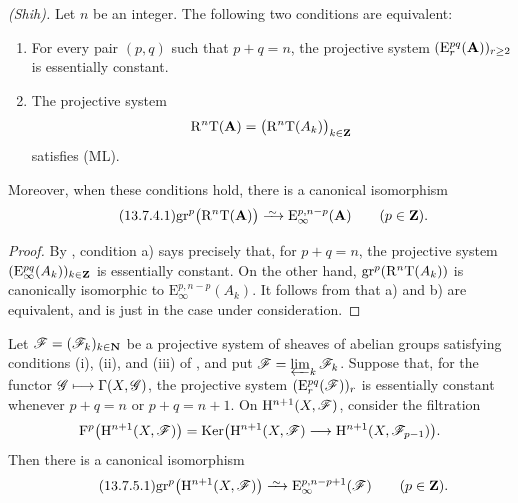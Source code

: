 \begin{proposition}[13.7.4]
\label{0.13.7.4}
\emph{(Shih).}
Let $n$ be an integer.
The following two conditions are equivalent:
\begin{enumerate}
  \item[{\rm a)}] For every pair $(p,q)$ such that $p+q=n$, the
  projective system
  $(\mathrm{E}_r^{pq}(\mathbf{A}))_{r\geq2}$ is essentially constant.
  \item[{\rm b)}] The projective system
  \[
    \mathrm{R}^n\mathrm{T}(\mathbf{A})
    =
    \bigl(\mathrm{R}^n\mathrm{T}(A_k)\bigr)_{k\in\mathbf{Z}}
  \]
  satisfies {\rm(ML)}.
\end{enumerate}
Moreover, when these conditions hold, there is a canonical
isomorphism
\begin{equation}
\label{0.13.7.4.1}
\tag{13.7.4.1}
  \mathrm{gr}^p\bigl(\RR^n\mathrm{T}(\bb{A})\bigr)
  \isoto
  \mathrm{E}_\infty^{p,n-p}(\bb{A})
  \qquad(p\in\bb{Z}).
\end{equation}
\end{proposition}

\begin{proof}
By , condition {\rm a)} says precisely that, for
$p+q=n$, the projective system
$(\mathrm{E}_\infty^{pq}(A_k))_{k\in\mathbf{Z}}$ is essentially
constant.
On the other hand,
$\mathrm{gr}^p(\mathrm{R}^n\mathrm{T}(A_k))$ is canonically isomorphic to
$\mathrm{E}_\infty^{p,n-p}(A_k)$.
It follows from  that {\rm a)} and {\rm b)} are
equivalent, and  is just
 in the case under consideration.
\end{proof}

\begin{corollary}[13.7.5]
\label{0.13.7.5}
Let $\mathscr{F}=(\mathscr{F}_k)_{k\in\mathbf{N}}$ be a projective system of
sheaves of abelian groups satisfying conditions {\rm(i)}, {\rm(ii)},
and {\rm(iii)} of , and put
$\mathscr{F}=\varprojlim_k\mathscr{F}_k$.
Suppose that, for the functor
$\mathscr{G}\longmapsto\Gamma(X,\mathscr{G})$, the projective system
$(\mathrm{E}_r^{pq}(\mathscr{F}))_r$ is essentially constant whenever
$p+q=n$ or $p+q=n+1$.
On $\mathrm{H}^{n+1}(X,\mathscr{F})$, consider the filtration
\[
  \mathrm{F}^p\bigl(\mathrm{H}^{n+1}(X,\mathscr{F})\bigr)
  =
  \operatorname{Ker}\bigl(
    \mathrm{H}^{n+1}(X,\mathscr{F})
    \longrightarrow
    \mathrm{H}^{n+1}(X,\mathscr{F}_{p-1})
  \bigr).
\]
Then there is a canonical isomorphism
\begin{equation}
\label{0.13.7.5.1}
\tag{13.7.5.1}
  \mathrm{gr}^p\bigl(\HH^{n+1}(X,\sh{F})\bigr)
  \isoto
  \mathrm{E}_\infty^{p,n-p+1}(\sh{F})
  \qquad(p\in\bb{Z}).
\end{equation}
\end{corollary}

